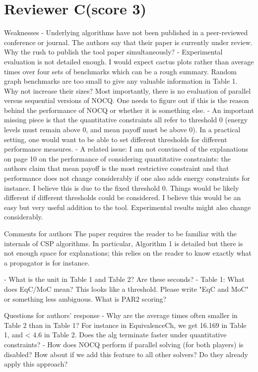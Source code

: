 \documentclass{article}
\begin{document}
\section{Reviewer C(score 3)}\label{rev:C}
\begin{reviewer}
Weaknesses
- Underlying algorithms have not been published in a peer-reviewed conference or journal. The authors say that their paper is currently under review. Why the rush to publish the tool paper simultaneously?
- Experimental evaluation is not detailed enough. I would expect cactus plots rather than average times over four sets of benchmarks which can be a rough summary. Random graph benchmarks are too small to give any valuable information in Table 1. Why not increase their sizes? Most importantly, there is no evaluation of parallel versus sequential versions of NOCQ. One needs to figure out if this is the reason behind the performance of NOCQ or whether it is something else.
- An important missing piece is that the quantitative constraints all refer to threshold 0 (energy levels must remain above 0, and mean payoff must be above 0). In a practical setting, one would want to be able to set different thresholds for different performance measures.
- A related issue: I am not convinced of the explanations on page 10 on the performance of considering quantitative constraints: the authors claim that mean payoff is the most restrictive constraint and that performance does not change considerably if one also adds energy constraints for instance. I believe this is due to the fixed threshold 0. Things would be likely different if different thresholds could be considered. I believe this would be an easy but very useful addition to the tool. Experimental results might also change considerably.

Comments for authors
The paper requires the reader to be familiar with the internals of CSP algorithms. In particular, Algorithm 1 is detailed but there is not enough space for explanations; this relies on the reader to know exactly what a propagator is for instance.

- What is the unit in Table 1 and Table 2? Are these seconds?
- Table 1: What does EqC/MoC mean? This looks like a threshold. Please write "EqC and MoC" or something less ambiguous. What is PAR2 scoring?

Questions for authors’ response
- Why are the average times often smaller in Table 2 than in Table 1? For instance in EquivalenceCh, we get 16.169 in Table 1, and < 4.6 in Table 2.
  Does the alg terminate faster under quantitative constraints?
- How does NOCQ perform if parallel solving (for both players) is disabled? How about if we add this feature to all other solvers? Do they already apply this approach?
\end{reviewer}
\end{document}
